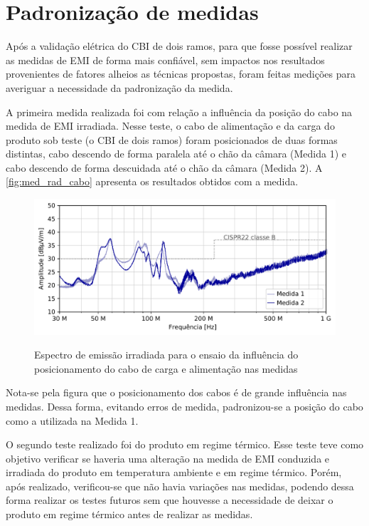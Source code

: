     \section{Padronização de medidas} \label{cap:result_padrao}
    
    Após a validação elétrica do CBI de dois ramos, para que fosse possível realizar as medidas de EMI de forma mais confiável, sem impactos nos resultados provenientes de fatores alheios as técnicas propostas, foram feitas medições para averiguar a necessidade da padronização da medida.  
    
    A primeira medida realizada foi com relação a influência da posição do cabo na medida de EMI irradiada. Nesse teste, o cabo de alimentação e da carga do produto sob teste (o CBI de dois ramos) foram posicionados de duas formas distintas, cabo descendo de forma paralela até o chão da câmara (Medida 1) e cabo descendo de forma descuidada até o chão da câmara (Medida 2). A \autoref{fig:med_rad_cabo} apresenta os resultados obtidos com a medida. 
    
    \begin{figure}[H]
    	\centering
    	\caption{Espectro de emissão irradiada para o ensaio da influência do posicionamento do cabo de carga e alimentação nas medidas}
    	\includegraphics[scale=.9]{pdf/rad/Sem o cuidado com o cabo2.pdf}
    	\label{fig:med_rad_cabo}
    \end{figure}
    
    Nota-se pela figura que o posicionamento dos cabos é de grande influência nas medidas. Dessa forma, evitando erros de medida, padronizou-se a posição do cabo como a utilizada na Medida 1.
    
    O segundo teste realizado foi do produto em regime térmico. Esse teste teve como objetivo verificar se haveria uma alteração na medida de EMI conduzida e irradiada do produto em temperatura ambiente e em regime térmico. Porém, após realizado, verificou-se que não havia variações nas medidas, podendo dessa forma realizar os testes futuros sem que houvesse a necessidade de deixar o produto em regime térmico antes de realizar as medidas. 
    
